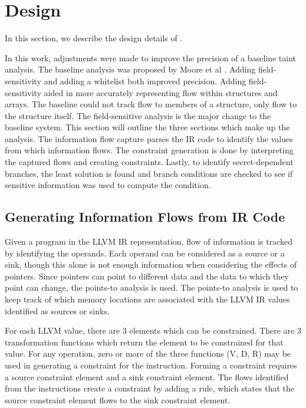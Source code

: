 \section{\sysname{} Design}

In this section, we describe the design details of \sysname{}.

In this work, adjustments were made to improve the precision of a baseline
taint analysis. The baseline analysis was proposed by Moore et al
\cite{moore2011static}. Adding field-sensitivity and adding a whitelist both
improved precision. Adding field-sensitivity aided in more
accurately representing flow within structures and arrays. The baseline could
not track flow to members of a structure, only flow to the structure itself. The
field-sensitive analysis is the major change to the baseline system. This
section will outline the three sections which make up the analysis. The
information flow capture parses the IR code to identify the values from which
information flows. The constraint generation is done by interpreting the
captured flows and creating constraints. Lastly, to identify secret-dependent
branches, the least solution is found and branch conditions are checked to see if
sensitive information was used to compute the condition.

\subsection{Generating Information Flows from IR Code}

   Given a program in the LLVM IR representation, flow of information is tracked
   by identifying the operands. Each operand can be considered as a source or a
   sink, though this alone is not enough information when considering the
   effects of pointers. Since pointers can point to different data and the data
   to which they point can change, the points-to analysis is used. The
   points-to analysis is used to keep track of which memory locations are
   associated with the LLVM IR values identified as sources or sinks.

   For each LLVM value, there are 3 elements which can be constrained. There are
   3 transformation functions which return the element to be constrained for
   that value. For any operation, zero or more of the three functions (V, D, R)
   may be used in generating a constraint for the instruction. Forming a
   constraint requires a source constraint element and a sink constraint
   element. The flows identified from the instructions create a constraint by
   adding a rule, which states that the source constraint element flows to the sink
   constraint element.

